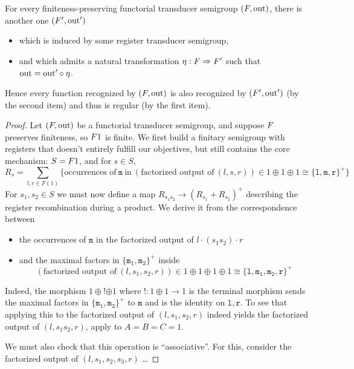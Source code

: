 \documentclass[a4paper,UKenglish,cleveref, autoref, thm-restate, numberwithinsect]{lipics-v2021}
\newcommand{\tito}[1]{\todo[inline,color=green!40]{Tito --- #1}}
\begin{document}
\begin{theorem}
  For every finiteness-preserving functorial transducer semigroup $(\functor, \outfun)$, there is another one $(\functor',\outfun')$
  \begin{itemize}
    \item which is induced by some register transducer semigroup,
    \item and which admits a natural transformation $\eta : \functor \Rightarrow \functor'$ such that $\mathrm{out} = \mathrm{out}' \circ \eta$.
  \end{itemize}
  Hence every function recognized by $(\functor,\outfun)$ is also recognized by $(\functor',\outfun')$ (by the second item) and thus is regular (by the first item).
\end{theorem}
\begin{proof}
    Let $(\functor,\outfun)$ be a functorial transducer semigroup, and suppose $\functor$ preserves finiteness, so $\functor1$ is finite. We first build a finitary semigroup with registers that doesn't entirely fulfill our objectives, but still contains the core mechanism: $S = \functor1$, and for $s\in S$,
    \[ R_s = \sum_{l,r \in F(1)} \{\text{occurrences of}\ \mathtt{m}\ \text{in}\ (\text{factorized output of}\ (l,s,r)) \in 1\oplus1\oplus1 \cong \{\mathtt{l,m,r}\}^+\} \]
    For $s_1,s_2\in S$ we must now define a map $R_{s_1 s_2} \to (R_{s_1} + R_{s_2})^+$ describing the register recombination during a product. We derive it from the correspondence between
    \begin{itemize}
        \item the occurrences of $\mathtt{m}$ in the factorized output of $l \cdot (s_1 s_2)\cdot r$
        \item and the maximal factors in $\{\mathtt{m_1,m_2}\}^+$ inside
        \[ (\text{factorized output of}\ (l,s_1,s_2,r)) \in 1\oplus1\oplus1\oplus1 \cong \{\mathtt{l,m_1,m_2,r}\}^+ \]
    \end{itemize}
    Indeed, the morphism $1\oplus\mathop{!}\oplus1$ where $! : 1\oplus1 \to 1$ is the terminal morphism sends the maximal factors in $\{\mathtt{m_1,m_2}\}^+$ to $\mathtt{m}$ and is the identity on $\mathtt{l,r}$. To see that applying this to the factorized output of $(l,s_1,s_2,r)$ indeed yields the factorized output of $(l,s_1s_2,r)$, apply  to $A=B=C=1$.

    We must also check that this operation is \enquote{associative}. For this, consider the factorized output of $(l,s_1,s_2,s_3,r)$ \ldots{}
    \tito{TODO above}


\end{proof}
\end{document}
